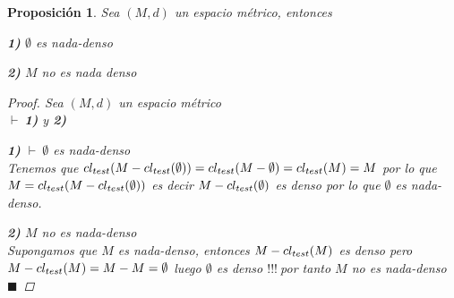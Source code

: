 \documentclass[oneside]{book} %
\theoremstyle{Teorema}
\newtheorem{Proposicion}[Definicion]{Proposición}
\theoremstyle{Ejemplos}
\theoremstyle{[Obs]}
\def \test {test}
\newcommand{\cerradura}[2][\test]{\ifx \test #1 {\overline{#2}} \else {cl_{#1}(#2)} \fi} %
\renewcommand{\{}{\left\lbrace} %
\renewcommand{\}}{\right\rbrace} %
\renewcommand{\qed}{$\blacksquare$} %
\newcommand{\pd}{$\vdash\ $} %
\renewcommand{\c}{$!!!\ $} %
\begin{document}
			\begin{Proposicion}\setlength{\parindent}{0em}
			
				Sea $(M, d)$ un espacio métrico, entonces 

				\textbf{1)} $\emptyset$ es nada-denso 

				\textbf{2)} $M$ no es nada denso 

				\begin{proof}
					
					Sea $(M, d)$ un espacio métrico \\ 
					\pd \textbf{1)} y \textbf{2)}

					\textbf{1)} \pd $\emptyset$ es nada-denso \\
					Tenemos que $\cerradura{M - \cerradura{\emptyset}} = \cerradura{M - \emptyset} = \cerradura{M} = M$ por lo que $M = \cerradura{M - \cerradura{\emptyset}}$ es decir $M - \cerradura{\emptyset}$ es denso por lo que $\emptyset$ es nada-denso. 

					\textbf{2)} $M$ no es nada-denso \\ 
					Supongamos que $M$ es nada-denso, entonces $M - \cerradura{M}$ es denso pero $M - \cerradura{M} = M - M = \emptyset$ luego $\emptyset$ es denso \c por tanto $M$ no es nada-denso \qed

				\end{proof}
			
			\end{Proposicion}
\end{document}
